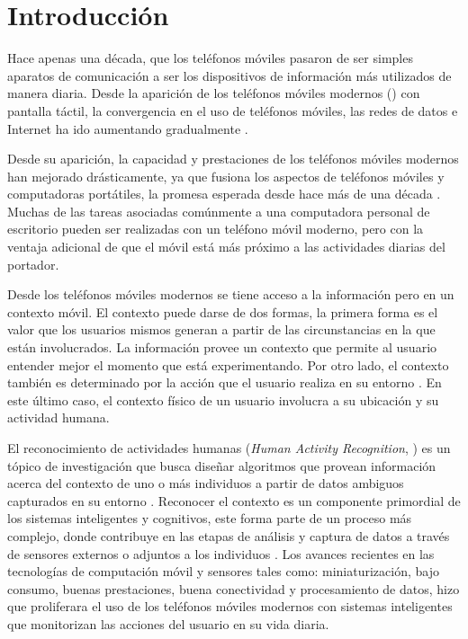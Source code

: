 
\chapter{Introducción}

\label{chap1:introduccion}

Hace apenas una década, que los teléfonos móviles pasaron de ser simples
aparatos de comunicación a ser los dispositivos de información más
utilizados de manera diaria. Desde la aparición de los teléfonos móviles
modernos (\emph{}) con pantalla táctil, la convergencia
en el uso de teléfonos móviles, las redes de datos e Internet ha ido
aumentando gradualmente \cite{Fling2009}.

Desde su aparición, la capacidad y prestaciones de los teléfonos móviles
modernos han mejorado drásticamente, ya que fusiona los aspectos de
teléfonos móviles y computadoras portátiles, la promesa esperada desde
hace más de una década \cite{Tanenbaum2010}. Muchas de las tareas
asociadas comúnmente a una computadora personal de escritorio pueden
ser realizadas con un teléfono móvil moderno, pero con la ventaja
adicional de que el móvil está más próximo a las actividades diarias
del portador.

Desde los teléfonos móviles modernos se tiene acceso a la información
pero en un contexto móvil. El contexto puede darse de dos formas,
la primera forma es el valor que los usuarios mismos generan a partir
de las circunstancias en la que están involucrados. La información
provee un contexto que permite al usuario entender mejor el momento
que está experimentando. Por otro lado, el contexto también es determinado
por la acción que el usuario realiza en su entorno \cite{Fling2009}.
En este último caso, el contexto físico de un usuario involucra a
su ubicación y su actividad humana. 

El reconocimiento de actividades humanas (\emph{Human Activity Recognition},
) es un tópico de investigación que busca diseñar algoritmos
que provean información acerca del contexto de uno o más individuos
a partir de datos ambiguos capturados en su entorno \cite{Bao2004}.
Reconocer el contexto es un componente primordial de los sistemas
inteligentes y cognitivos, este forma parte de un proceso más complejo,
donde contribuye en las etapas de análisis y captura de datos a través
de sensores externos o adjuntos a los individuos \cite{ReyesOrtiz2015,Chen2012}.
Los avances recientes en las tecnologías de computación móvil y sensores
tales como: miniaturización, bajo consumo, buenas prestaciones, buena
conectividad y procesamiento de datos, hizo que proliferara el uso
de los teléfonos móviles modernos con sistemas inteligentes que monitorizan
las acciones del usuario en su vida diaria. 

